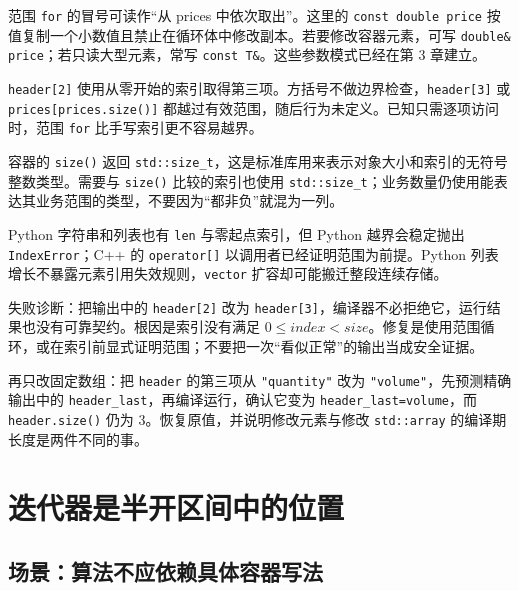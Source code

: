 范围 \texttt{for} 的冒号可读作“从 prices 中依次取出”。这里的 \texttt{const double price} 按值复制一个小数值且禁止在循环体中修改副本。若要修改容器元素，可写 \texttt{double\& price}；若只读大型元素，常写 \texttt{const T\&}。这些参数模式已经在第 3 章建立。

\texttt{header[2]} 使用从零开始的索引取得第三项。方括号不做边界检查，\texttt{header[3]} 或 \texttt{prices[prices.size()]} 都越过有效范围，随后行为未定义。已知只需逐项访问时，范围 \texttt{for} 比手写索引更不容易越界。

容器的 \texttt{size()} 返回 \texttt{std::size\_t}，这是标准库用来表示对象大小和索引的无符号整数类型。需要与 \texttt{size()} 比较的索引也使用 \texttt{std::size\_t}；业务数量仍使用能表达其业务范围的类型，不要因为“都非负”就混为一列。

\begin{pythonbridge}
Python 字符串和列表也有 \texttt{len} 与零起点索引，但 Python 越界会稳定抛出 \texttt{IndexError}；C++ 的 \texttt{operator[]} 以调用者已经证明范围为前提。Python 列表增长不暴露元素引用失效规则，\texttt{vector} 扩容却可能搬迁整段连续存储。

\end{pythonbridge}

失败诊断：把输出中的 \texttt{header[2]} 改为 \texttt{header[3]}，编译器不必拒绝它，运行结果也没有可靠契约。根因是索引没有满足 \(0 \leq index < size\)。修复是使用范围循环，或在索引前显式证明范围；不要把一次“看似正常”的输出当成安全证据。

再只改固定数组：把 \texttt{header} 的第三项从 \texttt{"quantity"} 改为 \texttt{"volume"}，先预测精确输出中的 \texttt{header\_last}，再编译运行，确认它变为 \texttt{header\_last=volume}，而 \texttt{header.size()} 仍为 3。恢复原值，并说明修改元素与修改 \texttt{std::array} 的编译期长度是两件不同的事。

\section{迭代器是半开区间中的位置}

\subsection{场景：算法不应依赖具体容器写法}

